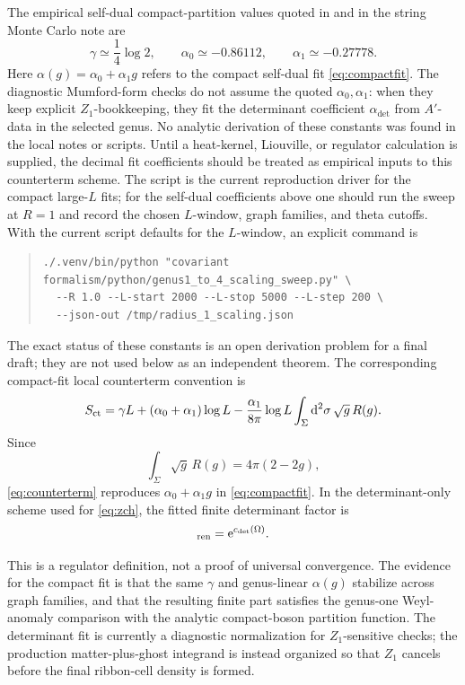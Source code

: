 \documentclass[11pt]{article}
\numberwithin{equation}{section}
\newcommand{\dd}{\mathrm d}
\newcommand{\ee}{\mathrm e}
\begin{document}
The empirical self-dual compact-partition values quoted in 
and in the string Monte Carlo note are
\[
        \gamma\simeq \frac{1}{4}\log2,\qquad
        \alpha_0\simeq -0.86112,\qquad
        \alpha_1\simeq -0.27778.
\]
Here \(\alpha(g)=\alpha_0+\alpha_1g\) refers to the compact self-dual fit
\eqref{eq:compactfit}.  The diagnostic Mumford-form checks do not assume the
quoted \(\alpha_0,\alpha_1\): when they keep explicit \(Z_1\)-bookkeeping, they
fit the determinant coefficient \(\alpha_{\det}\) from \(A'\)-data in the
selected genus.
No analytic derivation of these constants was found in the local notes or
scripts.  Until a heat-kernel, Liouville, or regulator calculation is supplied,
the decimal fit coefficients should be treated as empirical inputs to this
counterterm scheme.
The script  is the current reproduction
driver for the compact large-\(L\) fits; for the self-dual coefficients above one
should run the sweep at \(R=1\) and record the chosen \(L\)-window, graph
families, and theta cutoffs.
With the current script defaults for the \(L\)-window, an explicit command is
\begin{quote}
\small
\begin{verbatim}
./.venv/bin/python "covariant formalism/python/genus1_to_4_scaling_sweep.py" \
  --R 1.0 --L-start 2000 --L-stop 5000 --L-step 200 \
  --json-out /tmp/radius_1_scaling.json
\end{verbatim}
\end{quote}
The exact status of these constants is an open derivation problem for a final
draft; they are not used below as an independent theorem.
The corresponding compact-fit local counterterm convention is
\begin{equation}
        S_{\rm ct}
        =
        \gamma L+(\alpha_0+\alpha_1)\log L
        -
        \frac{\alpha_1}{8\pi}\log L
        \int_{\Sigma}\dd^2\sigma\,\sqrt g\,R(g).
        \label{eq:counterterm}
\end{equation}
Since
\[
        \int_{\Sigma}\sqrt g\,R(g)=4\pi(2-2g),
\]
\eqref{eq:counterterm} reproduces \(\alpha_0+\alpha_1g\) in
\eqref{eq:compactfit}.  In the determinant-only scheme used for
\eqref{eq:zch}, the fitted finite determinant factor is
\begin{equation}
        [(\det A')^{-1/2}]_{\rm ren}=\ee^{c_{\det}(\Omega)}.
\end{equation}

This is a regulator definition, not a proof of universal convergence.  The
evidence for the compact fit is that the same \(\gamma\) and genus-linear
\(\alpha(g)\) stabilize across graph families, and that the resulting finite
part satisfies the genus-one Weyl-anomaly comparison with the analytic
compact-boson partition function.  The determinant fit is currently a
diagnostic normalization for \(Z_1\)-sensitive checks; the production
matter-plus-ghost integrand is instead organized so that \(Z_1\) cancels before
the final ribbon-cell density is formed.
\end{document}
